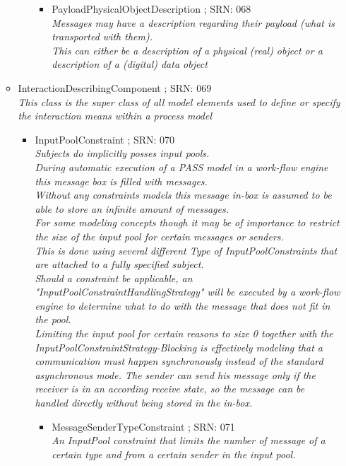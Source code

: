 \begin{itemize}
\begin{itemize}
\begin{itemize}
\begin{itemize}
			\item PayloadPhysicalObjectDescription ; SRN: 068 \\ \textit{Messages may have a description regarding their payload (what is transported with them).\\This can either be a description of a physical (real) object or a description of a (digital) data object}
		\end{itemize}
	\end{itemize}
	\item InteractionDescribingComponent ; SRN: 069 \\ \textit{This class is the super class of all model elements used to define or specify the interaction means within a process model}
	\begin{itemize}
		\item InputPoolConstraint ; SRN: 070 \\ \textit{Subjects do implicitly posses input pools.\\
			During automatic execution of a PASS model in a work-flow engine this message box is filled with messages.\\
			Without any constraints models this message in-box is assumed to be able to store an infinite amount of messages.\\
			For some modeling concepts though it may be of importance to restrict the size of the input pool for certain messages or senders.\\This is done using several different Type of InputPoolConstraints that are attached to a fully specified subject.\\Should a constraint be applicable, an "InputPoolConstraintHandlingStrategy" will be executed by a work-flow engine to determine what to do with the message that does not fit in the pool.\\
			Limiting the input pool for certain reasons to size 0 together with the InputPoolConstraintStrategy-Blocking is effectively modeling that a communication must happen synchronously instead of the standard asynchronous mode. The sender can send his message only if the receiver is in an according receive state, so the message can be handled directly without being stored in the in-box.}
		\begin{itemize}
			\item MessageSenderTypeConstraint ; SRN: 071 \\ \textit{An InputPool constraint that limits the number of message of a certain type and from a certain sender in the input pool.\\
}
\end{itemize}
\end{itemize}
\end{itemize}
\end{itemize}
